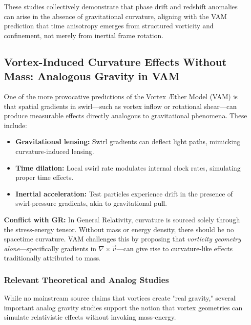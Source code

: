 These studies collectively demonstrate that phase drift and redshift anomalies can arise in the absence of gravitational curvature, aligning with the VAM prediction that time anisotropy emerges from structured vorticity and confinement, not merely from inertial frame rotation.

\subsection{Vortex-Induced Curvature Effects Without Mass: Analogous Gravity in VAM}

One of the more provocative predictions of the Vortex Æther Model (VAM) is that spatial gradients in swirl---such as vortex inflow or rotational shear---can produce measurable effects directly analogous to gravitational phenomena. These include:

\begin{itemize}
    \item \textbf{Gravitational lensing:} Swirl gradients can deflect light paths, mimicking curvature-induced lensing.
    \item \textbf{Time dilation:} Local swirl rate modulates internal clock rates, simulating proper time effects.
    \item \textbf{Inertial acceleration:} Test particles experience drift in the presence of swirl-pressure gradients, akin to gravitational pull.
\end{itemize}

\textbf{Conflict with GR:} In General Relativity, curvature is sourced solely through the stress-energy tensor. Without mass or energy density, there should be no spacetime curvature. VAM challenges this by proposing that \emph{vorticity geometry alone}---specifically gradients in $\nabla \times \vec{v}$---can give rise to curvature-like effects traditionally attributed to mass.

\subsubsection{Relevant Theoretical and Analog Studies}

While no mainstream source claims that vortices create "real gravity," several important analog gravity studies support the notion that vortex geometries can simulate relativistic effects without invoking mass-energy.

